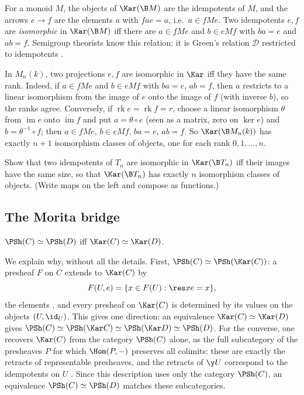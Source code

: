 \begin{example}[Monoids]\label{ex:karM}
For a monoid $M$, the objects of $\Kar(\B M)$ are the idempotents of $M$, and the arrows $e\to f$ are the elements $a$ with $fae = a$, i.e.\ $a\in fMe$. Two idempotents $e,f$ are \emph{isomorphic} in $\Kar(\B M)$ iff there are $a\in fMe$ and $b\in eMf$ with $ba = e$ and $ab = f$. Semigroup theorists know this relation: it is Green's relation $\mathcal D$ restricted to idempotents \cite[Prop.~3.1]{costa-steinberg}.
\end{example}

\begin{example}[Matrices]\label{ex:karMat}
In $M_n(k)$, two projections $e,f$ are isomorphic in $\Kar$ iff they have the same rank. Indeed, if $a\in fMe$ and $b\in eMf$ with $ba = e$, $ab = f$, then $a$ restricts to a linear isomorphism from the image of $e$ onto the image of $f$ (with inverse $b$), so the ranks agree. Conversely, if $\operatorname{rk}e = \operatorname{rk}f = r$, choose a linear isomorphism $\theta$ from $\operatorname{im} e$ onto $\operatorname{im} f$ and put $a = \theta\circ e$ (seen as a matrix, zero on $\ker e$) and $b = \theta^{-1}\circ f$; then $a\in fMe$, $b\in eMf$, $ba = e$, $ab = f$. So $\Kar(\B M_n(k))$ has exactly $n+1$ isomorphism classes of objects, one for each rank $0,1,\dots,n$.
\end{example}

\begin{exercise}\label{exo:karTn}
Show that two idempotents of $T_n$ are isomorphic in $\Kar(\B T_n)$ iff their images have the same size, so that $\Kar(\B T_n)$ has exactly $n$ isomorphism classes of objects. (Write maps on the left and compose as functions.)
\end{exercise}

\subsection{The Morita bridge}

\begin{bridge}[Morita]\label{br:morita}
$\PSh(C)\simeq\PSh(D)$ iff $\Kar(C)\simeq\Kar(D)$.
\end{bridge}

We explain why, without all the details. First, $\PSh(C)\simeq\PSh(\Kar(C))$: a presheaf $F$ on $C$ extends to $\Kar(C)$ by
\[
F(U,e) = \{x\in F(U) : \res xe = x\},
\]
the elements , and every presheaf on $\Kar(C)$ is determined by its values on the objects $(U,\id_U)$. This gives one direction: an equivalence $\Kar(C)\simeq\Kar(D)$ gives $\PSh(C)\simeq\PSh(\Kar C)\simeq\PSh(\Kar D)\simeq\PSh(D)$. For the converse, one recovers $\Kar(C)$ from the category $\PSh(C)$ alone, as the full subcategory of the presheaves $P$ for which $\Hom(P,-)$ preserves all colimits: these are exactly the retracts of representable presheaves, and the retracts of $\y U$ correspond to the idempotents on $U$ \cite[A1.1.9--10]{elephant}. Since this description uses only the category $\PSh(C)$, an equivalence $\PSh(C)\simeq\PSh(D)$ matches these subcategories.

